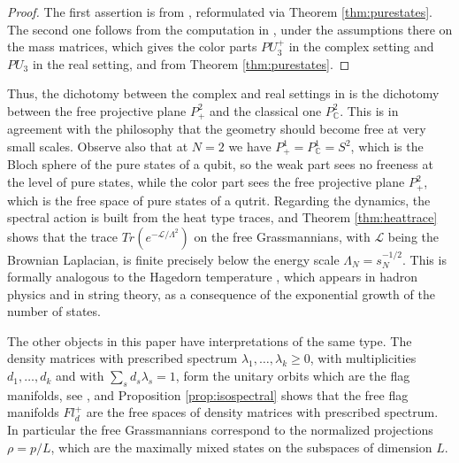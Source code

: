 \documentclass[11pt]{article}
\theoremstyle{plain}
\begin{document}
\begin{proof}
The first assertion is from \cite{bop}, reformulated via Theorem \ref{thm:purestates}. The second one follows from the computation in \cite{bdd}, under the assumptions there on the mass matrices, which gives the color parts $PU_3^+$ in the complex setting and $PU_3$ in the real setting, and from Theorem \ref{thm:purestates}.
\end{proof}

Thus, the dichotomy between the complex and real settings in \cite{bdd} is the dichotomy between the free projective plane $P^2_+$ and the classical one $P^2_\mathbb C$. This is in agreement with the philosophy that the geometry should become free at very small scales. Observe also that at $N=2$ we have $P^1_+=P^1_\mathbb C=S^2$, which is the Bloch sphere of the pure states of a qubit, so the weak part sees no freeness at the level of pure states, while the color part sees the free projective plane $P^2_+$, which is the free space of pure states of a qutrit. Regarding the dynamics, the spectral action \cite{ccs} is built from the heat type traces, and Theorem \ref{thm:heattrace} shows that the trace $Tr(e^{-\mathcal L/\Lambda^2})$ on the free Grassmannians, with $\mathcal L$ being the Brownian Laplacian, is finite precisely below the energy scale $\Lambda_N=s_N^{-1/2}$. This is formally analogous to the Hagedorn temperature \cite{hag}, which appears in hadron physics and in string theory, as a consequence of the exponential growth of the number of states.

\bigskip

The other objects in this paper have interpretations of the same type. The density matrices with prescribed spectrum $\lambda_1,\ldots,\lambda_k\geq0$, with multiplicities $d_1,\ldots,d_k$ and with $\sum_sd_s\lambda_s=1$, form the unitary orbits which are the flag manifolds, see \cite{bzy}, and Proposition \ref{prop:isospectral} shows that the free flag manifolds $Fl^+_d$ are the free spaces of density matrices with prescribed spectrum. In particular the free Grassmannians correspond to the normalized projections $\rho=p/L$, which are the maximally mixed states on the subspaces of dimension $L$.

\bigskip
\end{document}
